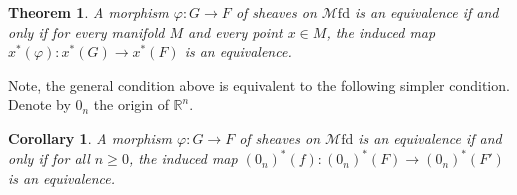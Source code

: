 \documentclass[10pt]{amsart}
\newcommand{\bR}{\mathbb{R}}
\newcommand{\Mfd}{\mathscr{M}\mathrm{fd}}
\newtheorem{theorem}[equation]{Theorem}
\newtheorem{corollary}[equation]{Corollary}
\theoremstyle{definition}
\theoremstyle{remark}
\numberwithin{equation}{section}
\begin{document}
\begin{theorem}
  A morphism $\varphi\colon G\to F$ of sheaves on $\Mfd$ is an equivalence if and only if for every manifold $M$ and every point $x \in M$, the induced map $x^*(\varphi) \colon x^*(G) \to x^*(F)$ is an equivalence.
\end{theorem}

Note, the general condition above is equivalent to the following simpler condition. Denote by $0_n$ the origin of $\bR^n$. 

\begin{corollary}
  A morphism $\varphi\colon G\to F$ of sheaves on $\Mfd$ is an equivalence if and only if for all $n \geq 0$, the induced map $(0_n)^*(f) \colon (0_n)^*(F) \to (0_n)^*(F')$ is an equivalence.
\end{corollary}


{\footnotesize


}
\end{document}
